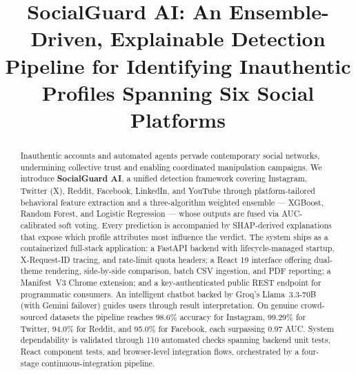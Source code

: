 \documentclass[conference]{IEEEtran}
\begin{document}
\title{SocialGuard AI: An Ensemble-Driven, Explainable Detection Pipeline for Identifying Inauthentic Profiles Spanning Six Social Platforms}

\author{
\and
{}
}

\maketitle

\begin{abstract}
Inauthentic accounts and automated agents pervade contemporary social networks, undermining collective trust and enabling coordinated manipulation campaigns. We introduce \textbf{SocialGuard AI}, a unified detection framework covering Instagram, Twitter (X), Reddit, Facebook, LinkedIn, and YouTube through platform-tailored behavioral feature extraction and a three-algorithm weighted ensemble --- XGBoost, Random Forest, and Logistic Regression --- whose outputs are fused via AUC-calibrated soft voting. Every prediction is accompanied by SHAP-derived explanations that expose which profile attributes most influence the verdict. The system ships as a containerized full-stack application: a FastAPI backend with lifecycle-managed startup, X-Request-ID tracing, and rate-limit quota headers; a React 19 interface offering dual-theme rendering, side-by-side comparison, batch CSV ingestion, and PDF reporting; a Manifest~V3 Chrome extension; and a key-authenticated public REST endpoint for programmatic consumers. An intelligent chatbot backed by Groq's Llama~3.3-70B (with Gemini failover) guides users through result interpretation. On genuine crowd-sourced datasets the pipeline reaches 98.6\% accuracy for Instagram, 99.29\% for Twitter, 94.0\% for Reddit, and 95.0\% for Facebook, each surpassing 0.97 AUC. System dependability is validated through 110 automated checks spanning backend unit tests, React component tests, and browser-level integration flows, orchestrated by a four-stage continuous-integration pipeline.
\end{abstract}
\end{document}
